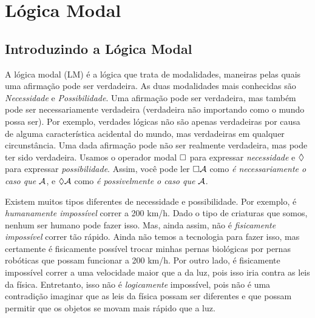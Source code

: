 
\part{Lógica Modal}
\label{ch.ML}

%

\chapter{Introduzindo a  Lógica Modal}
\label{Intro}


A lógica modal (LM) é a lógica que trata de modalidades, maneiras pelas quais uma afirmação pode ser verdadeira. As duas modalidades mais conhecidas são   \emph{Necessidade} e \emph{Possibilidade}. Uma afirmação pode ser verdadeira, mas também pode ser necessariamente verdadeira (verdadeira não importando como o mundo possa ser). Por exemplo, verdades lógicas não são apenas verdadeiras por causa de alguma característica acidental do mundo, mas verdadeiras em qualquer circunstância. Uma dada afirmação pode não ser realmente verdadeira, mas pode ter sido verdadeira. 
Usamos o operador modal $\Box$ para expressar \emph{necessidade} e $\Diamond$ para expressar \emph{possibilidade}. Assim, você pode ler $\Box \mathcal{A}$ como \emph{é necessariamente o caso que} $\mathcal{A}$, e $\Diamond \mathcal{A}$ como \emph{é possivelmente o caso que} $\mathcal{A}$.

Existem muitos tipos diferentes de necessidade e possibilidade. Por exemplo, é    \emph{humanamente impossível} correr a 200 km/h. Dado o tipo de criaturas que somos, nenhum ser humano pode fazer isso. Mas, ainda assim, não é \emph{fisicamente impossível} correr tão rápido. Ainda não temos a tecnologia para fazer isso, mas certamente é fisicamente possível trocar minhas pernas biológicas por pernas robóticas que possam funcionar a 200 km/h. Por outro lado, é fisicamente impossível correr a uma velocidade maior que a da luz, pois isso iria contra as leis da física. Entretanto, isso não é \emph{logicamente} impossível, pois não é uma contradição imaginar que as leis da física possam ser diferentes e que possam permitir que os objetos se movam mais rápido que a luz.

